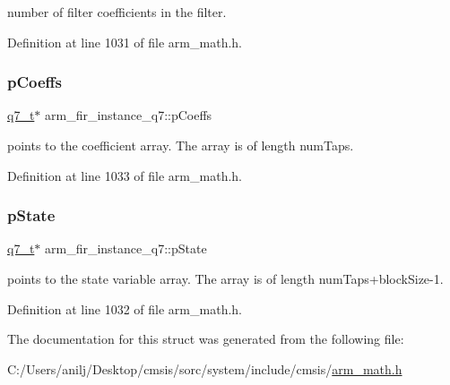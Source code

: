 number of filter coefficients in the filter. 

Definition at line 1031 of file arm\+\_\+math.\+h.

\mbox{\label{structarm__fir__instance__q7_a0e45aedefc3fffad6cb315c5b6e5bd49}} 
\subsubsection{\texorpdfstring{p\+Coeffs}{pCoeffs}}
{\footnotesize\ttfamily \hyperlink{arm__math_8h_ae541b6f232c305361e9b416fc9eed263}{q7\+\_\+t}$\ast$ arm\+\_\+fir\+\_\+instance\+\_\+q7\+::p\+Coeffs}

points to the coefficient array. The array is of length num\+Taps. 

Definition at line 1033 of file arm\+\_\+math.\+h.

\mbox{\label{structarm__fir__instance__q7_aaddea3b9c7e16ddfd9428b7bf9f9c200}} 
\subsubsection{\texorpdfstring{p\+State}{pState}}
{\footnotesize\ttfamily \hyperlink{arm__math_8h_ae541b6f232c305361e9b416fc9eed263}{q7\+\_\+t}$\ast$ arm\+\_\+fir\+\_\+instance\+\_\+q7\+::p\+State}

points to the state variable array. The array is of length num\+Taps+block\+Size-\/1. 

Definition at line 1032 of file arm\+\_\+math.\+h.



The documentation for this struct was generated from the following file\+:\begin{DoxyCompactItemize}
\item 
C\+:/\+Users/anilj/\+Desktop/cmsis/sorc/system/include/cmsis/\hyperlink{arm__math_8h}{arm\+\_\+math.\+h}\end{DoxyCompactItemize}
